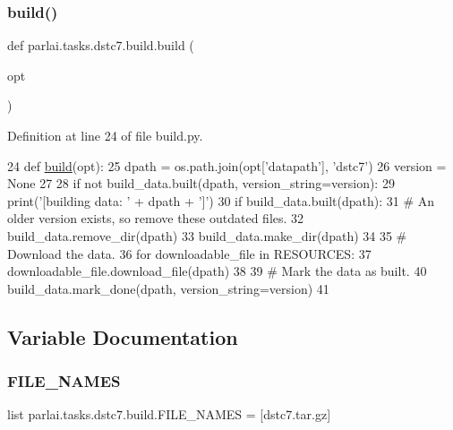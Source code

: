 \subsubsection{\texorpdfstring{build()}{build()}}
{\footnotesize\ttfamily def parlai.\+tasks.\+dstc7.\+build.\+build (\begin{DoxyParamCaption}\item[{}]{opt }\end{DoxyParamCaption})}



Definition at line 24 of file build.\+py.


\begin{DoxyCode}
24 \textcolor{keyword}{def }\hyperlink{namespacedialog__babi__feedback_1_1build_a7a9d289f7493a5ded13c4b7f071b6184}{build}(opt):
25     dpath = os.path.join(opt[\textcolor{stringliteral}{'datapath'}], \textcolor{stringliteral}{'dstc7'})
26     version = \textcolor{keywordtype}{None}
27 
28     \textcolor{keywordflow}{if} \textcolor{keywordflow}{not} build\_data.built(dpath, version\_string=version):
29         print(\textcolor{stringliteral}{'[building data: '} + dpath + \textcolor{stringliteral}{']'})
30         \textcolor{keywordflow}{if} build\_data.built(dpath):
31             \textcolor{comment}{# An older version exists, so remove these outdated files.}
32             build\_data.remove\_dir(dpath)
33         build\_data.make\_dir(dpath)
34 
35         \textcolor{comment}{# Download the data.}
36         \textcolor{keywordflow}{for} downloadable\_file \textcolor{keywordflow}{in} RESOURCES:
37             downloadable\_file.download\_file(dpath)
38 
39         \textcolor{comment}{# Mark the data as built.}
40         build\_data.mark\_done(dpath, version\_string=version)
41 \end{DoxyCode}


\subsection{Variable Documentation}
\mbox{\label{namespaceparlai_1_1tasks_1_1dstc7_1_1build_a183a00284d72fff9b77c2968abdd4f0a}} 
\subsubsection{\texorpdfstring{F\+I\+L\+E\+\_\+\+N\+A\+M\+ES}{FILE\_NAMES}}
{\footnotesize\ttfamily list parlai.\+tasks.\+dstc7.\+build.\+F\+I\+L\+E\+\_\+\+N\+A\+M\+ES = \mbox{[}\textquotesingle{}dstc7.\+tar.\+gz\textquotesingle{}\mbox{]}}



